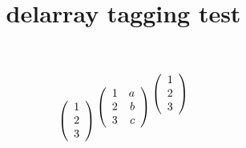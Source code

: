 \documentclass{article}
\title{delarray tagging test}
\begin{document}
\[
\begin{array}[t]({c}) 1\\2\\3 \end{array} 
\begin{array}[c]({cr}) 1 & a\\2 & b\\3 & c \end{array} 
\begin{array}[b]({c}) 1\\2\\3 \end{array}
\]
\end{document}
